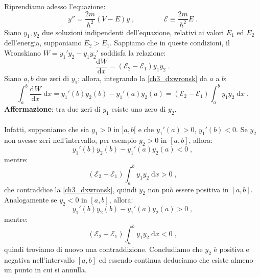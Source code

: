\documentclass[12pt,a4paper]{report}
\theoremstyle{definition}
\newcommand{\dev}[3][]{\frac{\mathrm{d}^{#1} #2}{\mathrm{d} #3^{#1}}}
\numberwithin{equation}{section}
\newcommand{\diff}[1][]{\mathrm{d}#1}
\begin{document}
\\
Riprendiamo adesso l'equazione:
\begin{equation}
y''=\frac{2m}{\hbar^2}(V-E)y\;, \qquad\qquad \mathcal{E}\equiv \frac{2m}{\hbar^2}E\;.
\end{equation}
Siano $y_1,y_2$ due soluzioni indipendenti dell'equazione, relativi ai valori $E_1$ ed $E_2$ dell'energia, supponiamo $E_2>E_1$. Sappiamo che in queste condizioni, il Wronskiano $W=y_1'y_2-y_1y_2'$ soddisfa la relazione:
\begin{equation}
\dev{W}{x}=(\mathcal{E}_2-\mathcal{E}_1)y_1y_2\;. \label{ch3_dxwronsk}
\end{equation}
Siano $a,b$ due zeri di $y_1$; allora, integrando la \eqref{ch3_dxwronsk} da $a$ a $b$:
\begin{equation}
\int_a^b\dev{W}{x}\; \diff{x}=y_1'(b)y_2(b)-y_1'(a)y_2(a)=(\mathcal{E}_2-\mathcal{E}_1)\int_a^b y_1y_2\;\diff{x}\;.
\end{equation}
\textbf{Affermazione}: tra due zeri di $y_1$ esiste uno zero di $y_2$. \\
\\
Infatti, supponiamo che sia $y_1>0$ in $]a,b[$ e che $y_1'(a)>0$, $y_1'(b)<0$. Se $y_2$ non avesse zeri nell'intervallo, per esempio $y_2>0$ in $[a,b]$, allora:
$$
y_1'(b)y_2(b)-y_1'(a)y_2(a)<0\;,
$$
mentre:
$$
(\mathcal{E}_2-\mathcal{E}_1)\int_a^b y_1y_2\;\diff{x}>0\;,
$$
che contraddice la \eqref{ch3_dxwronsk}, quindi $y_2$ non può essere positiva in $[a,b]$. Analogamente se $y_2<0$ in $[a,b]$, allora:
$$
y_1'(b)y_2(b)-y_1'(a)y_2(a)>0\;,
$$
mentre:
$$
(\mathcal{E}_2-\mathcal{E}_1)\int_a^b y_1y_2\;\diff{x}<0\;,
$$
quindi troviamo di nuovo una contraddizione. Concludiamo che $y_2$ è positiva e negativa nell'intervallo $[a,b]$ ed essendo continua deduciamo che esiste almeno un punto in cui si annulla.
\end{document}
